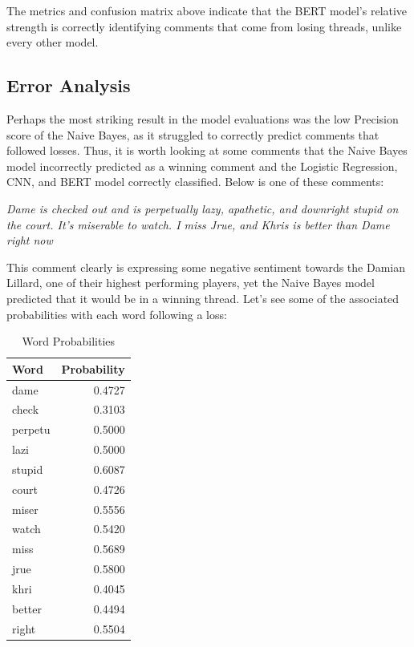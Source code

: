 \documentclass[twocolumn]{article}
\begin{document}
The metrics and confusion matrix above indicate that the BERT model's relative strength is correctly identifying comments that come from losing threads, unlike every other model.

\subsection{Error Analysis}

Perhaps the most striking result in the model evaluations was the low Precision score of the Naive Bayes, as it struggled to correctly predict comments that followed losses. Thus, it is worth looking at some comments that the Naive Bayes model incorrectly predicted as a winning comment and the Logistic Regression, CNN, and BERT model correctly classified. Below is one of these comments:

\begin{center}
\textit{Dame is checked out and is perpetually lazy, apathetic, and downright stupid on the court. It’s miserable to watch. I miss Jrue, and Khris is better than Dame right now}
\end{center}

This comment clearly is expressing some negative sentiment towards the Damian Lillard, one of their highest performing players, yet the Naive Bayes model predicted that it would be in a winning thread. Let's see some of the associated probabilities with each word following a loss:

\begin{table}[H]
\centering
\begin{tabular}{l r}
\hline
Word & Probability \\
\hline
dame & 0.4727 \\
check & 0.3103 \\
perpetu & 0.5000 \\
lazi & 0.5000 \\
stupid & 0.6087 \\
court & 0.4726 \\
miser & 0.5556 \\
watch & 0.5420 \\
miss & 0.5689 \\
jrue & 0.5800 \\
khri & 0.4045 \\
better & 0.4494 \\
right & 0.5504 \\
\hline
\end{tabular}
\caption{Word Probabilities}
\label{tab:word_probabilities}
\end{table}
\end{document}
